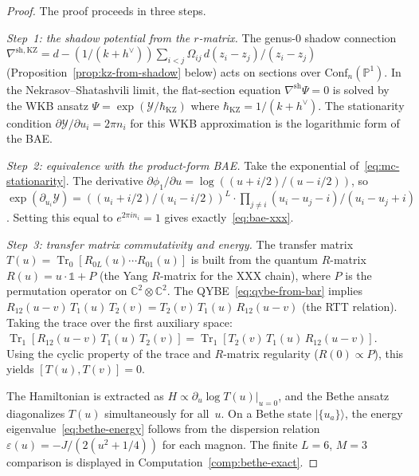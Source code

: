 \begin{proof}
The proof proceeds in three steps.

\emph{Step~1: the shadow potential from the $r$-matrix.}
The genus-$0$ shadow connection
$\nabla^{\mathrm{sh,KZ}} =
d - (1/(k+h^\vee))\sum_{i<j}
\Omega_{ij}\,d(z_i-z_j)/(z_i-z_j)$
(Proposition~\ref{prop:kz-from-shadow} below) acts on
sections over $\mathrm{Conf}_n(\mathbb{P}^1)$. In the
Nekrasov--Shatashvili limit, the flat-section equation
$\nabla^{\mathrm{sh}} \Psi = 0$ is solved by the WKB ansatz
$\Psi = \exp(\mathcal{Y}/\hbar_{\mathrm{KZ}})$ where
$\hbar_{\mathrm{KZ}} = 1/(k + h^\vee)$.
The stationarity condition
$\partial \mathcal{Y}/\partial u_i = 2\pi n_i$ for this WKB
approximation is the logarithmic form of the BAE.

\emph{Step~2: equivalence with the product-form BAE.}
Take the exponential of~\eqref{eq:mc-stationarity}. The derivative
$\partial \phi_1/\partial u = \log((u + i/2)/(u - i/2))$, so
$\exp(\partial_{u_i} \mathcal{Y}) = ((u_i + i/2)/(u_i - i/2))^L
\cdot \prod_{j \neq i} (u_i - u_j - i)/(u_i - u_j + i)$.
Setting this equal to $e^{2\pi i n_i} = 1$ gives
exactly~\eqref{eq:bae-xxx}.

\emph{Step~3: transfer matrix commutativity and energy.}
The transfer matrix
$T(u) = \operatorname{Tr}_0[R_{0L}(u) \cdots R_{01}(u)]$ is
built from the quantum $R$-matrix $R(u) = u \cdot \mathbb{1} + P$
(the Yang $R$-matrix for the XXX chain), where $P$ is the
permutation operator on $\mathbb{C}^2 \otimes \mathbb{C}^2$.
The QYBE~\eqref{eq:qybe-from-bar} implies
$R_{12}(u-v)\, T_1(u)\, T_2(v) = T_2(v)\, T_1(u)\, R_{12}(u-v)$
(the RTT relation). Taking the trace over the first auxiliary space:
$\operatorname{Tr}_1[R_{12}(u-v)\, T_1(u)\, T_2(v)]
= \operatorname{Tr}_1[T_2(v)\, T_1(u)\, R_{12}(u-v)]$.
Using the cyclic property of the trace and $R$-matrix regularity
($R(0) \propto P$), this yields $[T(u), T(v)] = 0$.

The Hamiltonian is extracted as
$H \propto \partial_u \log T(u)\big|_{u=0}$,
and the Bethe ansatz diagonalizes $T(u)$ simultaneously for all~$u$.
On a Bethe state $|\{u_a\}\rangle$, the energy
eigenvalue~\eqref{eq:bethe-energy} follows from the dispersion
relation $\varepsilon(u) = -J/(2(u^2 + 1/4))$ for each magnon.
The finite $L=6$, $M=3$ comparison is displayed in
Computation~\ref{comp:bethe-exact}.
\end{proof}


